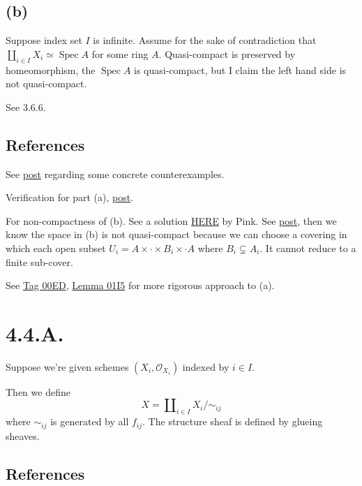 \subsection{(b)}

Suppose index set $I$ is infinite. Assume for the sake of contradiction that $\amalg_{i\in I}X_i\simeq \operatorname{Spec}A$ for some ring $A$. Quasi-compact is preserved by homeomorphism, the $\operatorname{Spec}A$ is quasi-compact, but I claim the left hand side is not quasi-compact. 

See 3.6.6.

\subsection{References}

See \href{https://math.stackexchange.com/questions/778440/spectrum-of-a-product-of-rings-isomorphic-to-the-product-of-the-spectra}{post} regarding some concrete counterexamples.

Verification for part (a), \href{https://math.stackexchange.com/questions/321018/why-is-the-disjoint-union-of-a-finite-number-of-affine-schemes-an-affine-scheme#:~:text=We%20know%20that%20the%20disjoint,space%20is%20not%20quasi%2Dcompact.}{post}.

For non-compactness of (b). See a solution \href{https://metaphor.ethz.ch/x/2017/fs/401-3146-12L/ex/SolSheet6.pdf}{HERE} by Pink. See \href{https://math.stackexchange.com/questions/3038162/proving-mathbbn-is-not-compact}{post}, then we know the space in (b) is not quasi-compact because we can choose a covering in which each open subset $U_i=A\times\cdot\times B_i\times \cdot A$ where $B_i\subsetneq A_i$. It cannot reduce to a finite sub-cover.

See \href{https://stacks.math.columbia.edu/tag/00ED}{Tag 00ED}, \href{https://stacks.math.columbia.edu/tag/01I5}{Lemma 01I5} for more rigorous approach to (a).


\section{4.4.A.}\label{4.4.A.}

Suppose we're given schemes $(X_i,\mathcal O_{X_i})$ indexed by $i\in I$.

Then we define 
\[X=\amalg_{i\in I}X_i/\sim_{ij}\]where $\sim_{ij}$ is generated by all $f_{ij}$. The structure sheaf is defined by glueing sheaves. 

\subsection{References}

